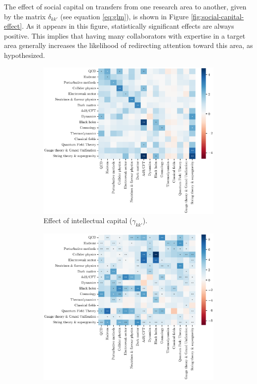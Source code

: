 \documentclass{article}
\begin{document}
The effect of social capital on transfers from one research area to another, given by the matrix $\delta_{kk'}$ (see equation \ref{eq:glm}), is shown in Figure \ref{fig:social-capital-effect}. As it appears in this figure, statistically significant effects are always positive. This implies that having many collaborators with expertise in a target area generally increases the likelihood of redirecting attention toward this area, as hypothesized. 


\begin{figure}[h]
\hspace{-2em}
\begin{subfigure}{.5\textwidth}
    \includegraphics[width=1\textwidth]{plots/ei_gamma_control_nu.eps}
    \caption{Effect of intellectual capital ($\gamma_{kk'}$).}
    \label{fig:intellectual-capital-effect}
\end{subfigure}%
\begin{subfigure}{.5\textwidth}
    \includegraphics[width=1\textwidth]{plots/ei_delta_control_nu.eps}

\end{subfigure}
\end{figure}
\end{document}
